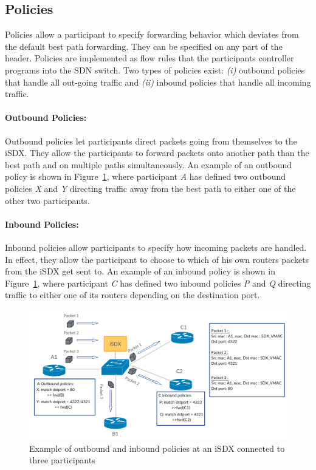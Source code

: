 \subsection{\label{chapter2:iSDX:policies}Policies}
Policies allow a participant to specify forwarding behavior which deviates from the default best path forwarding. They can be specified on any part of the header. Policies are implemented as flow rules that the participants controller programs into the SDN switch. Two types of policies exist: \emph{(i)} outbound policies that handle all out-going traffic and \emph{(ii)} inbound policies that handle all incoming traffic.

\paragraph{\label{chapter2:iSDX:policies:outbound policies}Outbound Policies:}
Outbound policies let participants direct packets going from themselves to the iSDX. They allow the participants to forward packets onto another path than the best path and on multiple paths simultaneously. An example of an outbound policy is shown in Figure~\ref{fig:isdx_policies}, where participant \emph{A} has defined two outbound policies \emph{X} and \emph{Y} directing traffic away from the best path to either one of the other two participants.

\paragraph{\label{chapter2:iSDX:policies:inbound policies}Inbound Policies:}
Inbound policies allow participants to specify how incoming packets are handled. In effect, they allow the participant to choose to which of his own routers packets from the iSDX get sent to. An example of an inbound policy is shown in Figure~\ref{fig:isdx_policies}, where participant \emph{C} has defined two inbound policies \emph{P} and \emph{Q} directing traffic to either one of its routers depending on the destination port. 

\begin{figure}[h]
\center
\includegraphics[scale = 0.31]{Figures/sdx_policies.pdf}
\caption{Example of outbound and inbound policies at an iSDX connected to three participants}
\label{fig:isdx_policies}
\end{figure}
  

